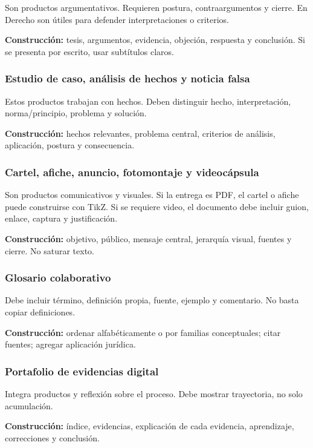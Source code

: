 Son productos argumentativos. Requieren postura, contraargumentos y cierre. En Derecho son útiles para defender interpretaciones o criterios.

\textbf{Construcción:} tesis, argumentos, evidencia, objeción, respuesta y conclusión. Si se presenta por escrito, usar subtítulos claros.

\subsubsection*{Estudio de caso, análisis de hechos y noticia falsa}

Estos productos trabajan con hechos. Deben distinguir hecho, interpretación, norma/principio, problema y solución.

\textbf{Construcción:} hechos relevantes, problema central, criterios de análisis, aplicación, postura y consecuencia.

\subsubsection*{Cartel, afiche, anuncio, fotomontaje y videocápsula}

Son productos comunicativos y visuales. Si la entrega es PDF, el cartel o afiche puede construirse con TikZ. Si se requiere video, el documento debe incluir guion, enlace, captura y justificación.

\textbf{Construcción:} objetivo, público, mensaje central, jerarquía visual, fuentes y cierre. No saturar texto.

\subsubsection*{Glosario colaborativo}

Debe incluir término, definición propia, fuente, ejemplo y comentario. No basta copiar definiciones.

\textbf{Construcción:} ordenar alfabéticamente o por familias conceptuales; citar fuentes; agregar aplicación jurídica.

\subsubsection*{Portafolio de evidencias digital}

Integra productos y reflexión sobre el proceso. Debe mostrar trayectoria, no solo acumulación.

\textbf{Construcción:} índice, evidencias, explicación de cada evidencia, aprendizaje, correcciones y conclusión.

